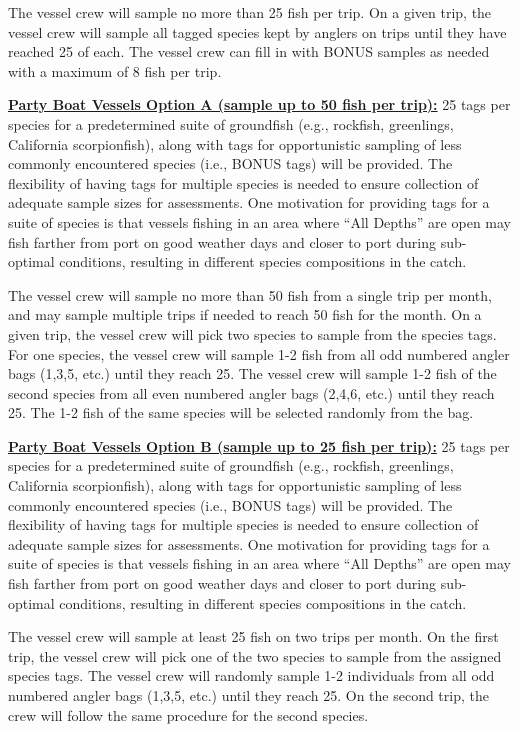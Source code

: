 \documentclass[
  letterpaper,
  DIV=11,
  numbers=noendperiod]{scrartcl}
\begin{document}
The vessel crew will sample no more than 25 fish per trip. On a given
trip, the vessel crew will sample all tagged species kept by anglers on
trips until they have reached 25 of each. The vessel crew can fill in
with BONUS samples as needed with a maximum of 8 fish per trip.

\href{https://drive.google.com/file/d/10tcgyl3dkq_NRH5TrU9DeakOrtZvPEXL/view?usp=sharing}{\textbf{Party
Boat Vessels Option A (sample up to 50 fish per trip):}} 25 tags per
species for a predetermined suite of groundfish (e.g., rockfish,
greenlings, California scorpionfish), along with tags for opportunistic
sampling of less commonly encountered species (i.e., BONUS tags) will be
provided. The flexibility of having tags for multiple species is needed
to ensure collection of adequate sample sizes for assessments. One
motivation for providing tags for a suite of species is that vessels
fishing in an area where ``All Depths'' are open may fish farther from
port on good weather days and closer to port during sub-optimal
conditions, resulting in different species compositions in the catch.

The vessel crew will sample no more than 50 fish from a single trip per
month, and may sample multiple trips if needed to reach 50 fish for the
month. On a given trip, the vessel crew will pick two species to sample
from the species tags. For one species, the vessel crew will sample 1-2
fish from all odd numbered angler bags (1,3,5, etc.) until they reach
25. The vessel crew will sample 1-2 fish of the second species from all
even numbered angler bags (2,4,6, etc.) until they reach 25. The 1-2
fish of the same species will be selected randomly from the bag.

\href{https://drive.google.com/file/d/14bi-9TEZSylgiLCytEaThr1CO-3Eljon/view?usp=sharing}{\textbf{Party
Boat Vessels Option B (sample up to 25 fish per trip):}} 25 tags per
species for a predetermined suite of groundfish (e.g., rockfish,
greenlings, California scorpionfish), along with tags for opportunistic
sampling of less commonly encountered species (i.e., BONUS tags) will be
provided. The flexibility of having tags for multiple species is needed
to ensure collection of adequate sample sizes for assessments. One
motivation for providing tags for a suite of species is that vessels
fishing in an area where ``All Depths'' are open may fish farther from
port on good weather days and closer to port during sub-optimal
conditions, resulting in different species compositions in the catch.

The vessel crew will sample at least 25 fish on two trips per month. On
the first trip, the vessel crew will pick one of the two species to
sample from the assigned species tags. The vessel crew will randomly
sample 1-2 individuals from all odd numbered angler bags (1,3,5, etc.)
until they reach 25. On the second trip, the crew will follow the same
procedure for the second species.
\end{document}
